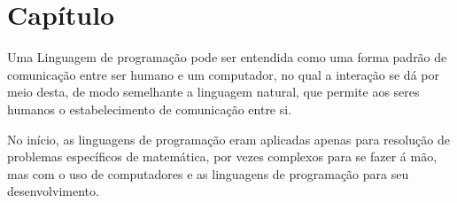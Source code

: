 \documentclass[tcc/ec]{faeng}
\begin{document}
\listailustracoes

\listatabelas


\sumario

\mainmatter


\chapter[Definição de  Linguagem de Programação]{Capítulo}
Uma Linguagem de programação pode ser entendida como uma forma padrão de comunicação entre ser humano e um computador, no qual a interação se dá por meio desta, de modo semelhante a linguagem  natural, que permite aos seres humanos o estabelecimento de comunicação entre si.

No início, as linguagens de programação eram aplicadas apenas para resolução de problemas específicos de matemática, por vezes complexos para se fazer á mão, mas com o uso de computadores e as linguagens de programação para seu desenvolvimento.
\end{document}
